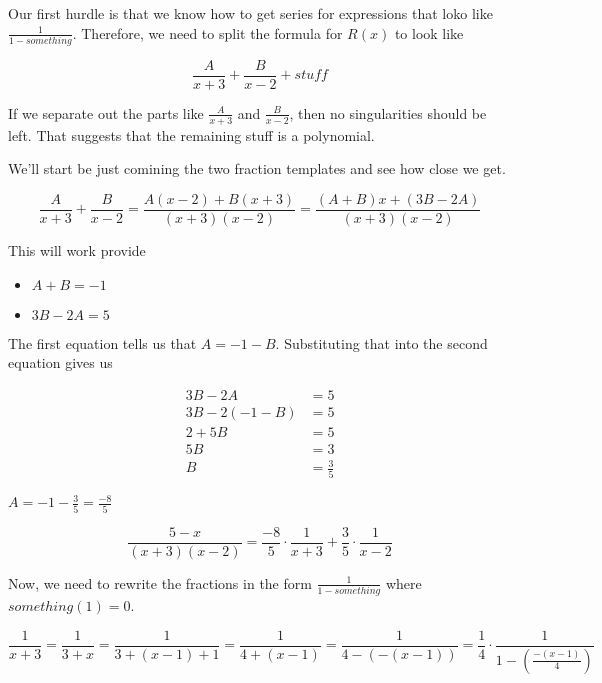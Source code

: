 \documentclass{ximera}
\begin{document}
Our first hurdle is that we know how to get series for expressions that loko like $\frac{1}{1-something}$.  Therefore, we need to split the formula for $R(x)$ to look like

\[    \frac{A}{x+3} + \frac{B}{x-2} + stuff          \]



If we separate out the parts like $\frac{A}{x+3}$ and $\frac{B}{x-2}$, then no singularities should be left.  That suggests that the remaining stuff is a polynomial.


We'll start be just comining the two fraction templates and see how close we get.





\[  \frac{A}{x+3} + \frac{B}{x-2}  = \frac{A(x-2) + B(x+3)}{(x+3)(x-2)}  = \frac{(A+B)x + (3B-2A)}{(x+3)(x-2)}       \]


This will work provide

\begin{itemize}
\item $A+B = -1$
\item $3B-2A = 5$
\end{itemize}

The first equation tells us that $A = -1 - B$.  Substituting that into the second equation gives us 


\begin{align*}
3B-2A     & = 5     \\
3B-2(-1 -B)     & = 5     \\
2 + 5B     & = 5     \\
5B     & = 3     \\
B & = \frac{3}{5}
\end{align*}


$A = -1 - \frac{3}{5} = \frac{-8}{5}$



\[ \frac{5-x}{(x+3)(x-2)}     =  \frac{-8}{5} \cdot \frac{1}{x+3} + \frac{3}{5} \cdot \frac{1}{x-2}       \]



Now, we need to rewrite the fractions in the form $\frac{1}{1 - something}$ where   $something(1) = 0$.






\[    \frac{1}{x+3}   = \frac{1}{3+x}  = \frac{1}{3+(x-1)+1}     = \frac{1}{4+(x-1)}     = \frac{1}{4-(-(x-1))}      =   \frac{1}{4} \cdot \frac{1}{1-\left( \frac{-(x-1)}{4} \right) }   \]
\end{document}
